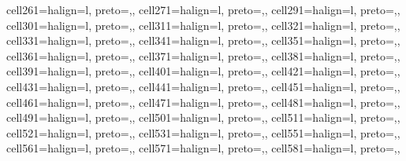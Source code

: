 \begin{table}
\begin{talltblr}[         %
entry=none,label=none,
note{}={* p \num{< 0.1}, ** p \num{< 0.05}, *** p \num{< 0.01}},
]
{cell{26}{1}={}{halign=l, preto={\hspace{1em}},},
cell{27}{1}={}{halign=l, preto={\hspace{1em}},},
cell{29}{1}={}{halign=l, preto={\hspace{1em}},},
cell{30}{1}={}{halign=l, preto={\hspace{1em}},},
cell{31}{1}={}{halign=l, preto={\hspace{1em}},},
cell{32}{1}={}{halign=l, preto={\hspace{1em}},},
cell{33}{1}={}{halign=l, preto={\hspace{1em}},},
cell{34}{1}={}{halign=l, preto={\hspace{1em}},},
cell{35}{1}={}{halign=l, preto={\hspace{1em}},},
cell{36}{1}={}{halign=l, preto={\hspace{1em}},},
cell{37}{1}={}{halign=l, preto={\hspace{1em}},},
cell{38}{1}={}{halign=l, preto={\hspace{1em}},},
cell{39}{1}={}{halign=l, preto={\hspace{1em}},},
cell{40}{1}={}{halign=l, preto={\hspace{1em}},},
cell{42}{1}={}{halign=l, preto={\hspace{1em}},},
cell{43}{1}={}{halign=l, preto={\hspace{1em}},},
cell{44}{1}={}{halign=l, preto={\hspace{1em}},},
cell{45}{1}={}{halign=l, preto={\hspace{1em}},},
cell{46}{1}={}{halign=l, preto={\hspace{1em}},},
cell{47}{1}={}{halign=l, preto={\hspace{1em}},},
cell{48}{1}={}{halign=l, preto={\hspace{1em}},},
cell{49}{1}={}{halign=l, preto={\hspace{1em}},},
cell{50}{1}={}{halign=l, preto={\hspace{1em}},},
cell{51}{1}={}{halign=l, preto={\hspace{1em}},},
cell{52}{1}={}{halign=l, preto={\hspace{1em}},},
cell{53}{1}={}{halign=l, preto={\hspace{1em}},},
cell{55}{1}={}{halign=l, preto={\hspace{1em}},},
cell{56}{1}={}{halign=l, preto={\hspace{1em}},},
cell{57}{1}={}{halign=l, preto={\hspace{1em}},},
cell{58}{1}={}{halign=l, preto={\hspace{1em}},},
}
\end{talltblr}
\end{table}
